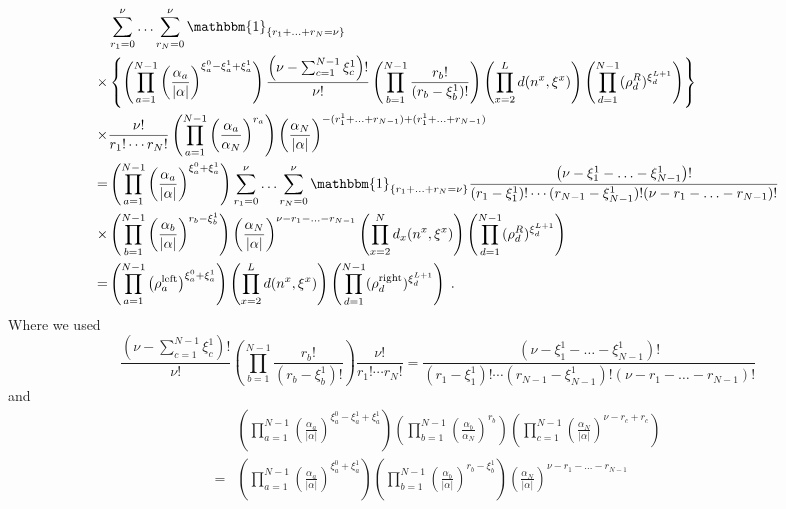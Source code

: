 \documentclass[10pt]{article}
\numberwithin{equation}{section}
\numberwithin{equation}{subsection}
\newcommand{\dt}{\;.}
\begin{document}
\begin{align}\label{pezzo1}
	&\sum_{r_{1}=0}^{\nu}\ldots\sum_{r_{N}=0}^{\nu}\mathbbm{1}_{\{r_{1}+\ldots+r_{N}=\nu\}}\nonumber
	\\
	\times&
	\left\{\left(\prod_{a=1}^{N-1}\left(\frac{\alpha_{a}}{|\alpha|}\right)^{\xi_{a}^{0}-\xi_{a}^{1}+\xi_{a}^{1}}\right)\frac{\left(\nu-\sum_{c=1}^{N-1}\xi_{c}^{1}\right)!}{\nu!}\left(\prod_{b=1}^{N-1}\frac{r_{b}!}{(r_{b}-\xi^{1}_{b})!}\right)\left(\prod_{x=2}^{L}d(n^{x},\xi^{x})\right)\left(\prod_{d=1}^{N-1}(\rho_{d}^{R})^{\xi_{d}^{L+1}}\right)\right\}\nonumber\\
	\times	&\frac{\nu!}{r_{1}!\cdots r_{N}!}\left(\prod_{a=1}^{N-1}\left(\frac{\alpha_{a}}{\alpha_{N}}\right)^{r_{a}}\right)\left(\frac{\alpha_{N}}{|\alpha|}\right)^{-(r_{1}^{1}+\ldots+r_{N-1})+(r_{1}^{1}+\ldots+r_{N-1})}\nonumber
	\\=&
	\left(\prod_{a=1}^{N-1}\left(\frac{\alpha_{a}}{|\alpha|}\right)^{\xi_{a}^{0}+\xi_{a}^{1}}\right)\sum_{r_{1}=0}^{\nu}\ldots\sum_{r_{N}=0}^{\nu}\mathbbm{1}_{\{r_{1}+\ldots+r_{N}=\nu\}}	\frac{\left(\nu-\xi_{1}^{1}-\ldots-\xi_{N-1}^{1}\right)!}{(r_{1}-\xi_{1}^{1})!\cdots(r_{N-1}-\xi_{N-1}^{1})!(\nu-r_{1}-\ldots-r_{N-1})!}\nonumber\\
	\times& \left(\prod_{b=1}^{N-1}\left(\frac{\alpha_{b}}{|\alpha|}\right)^{r_{b}-\xi_{b}^{1}}\right)\left(\frac{\alpha_{N}}{|\alpha|}\right)^{\nu-r_{1}-\ldots-r_{N-1}}\left(\prod_{x=2}^{N}d_{x}(n^{x},\xi^{x})\right)\left(\prod_{d=1}^{N-1}(\rho_{d}^{R})^{\xi_{d}^{L+1}}\right)\nonumber
	\\=&
	\left(\prod_{a=1}^{N-1}\left(\rho_{a}^{\text{left}}\right)^{\xi_{a}^{0}+\xi_{a}^{1}}\right)\left(\prod_{x=2}^{L}d(n^{x},\xi^{x})\right)\left(\prod_{d=1}^{N-1}(\rho_{d}^{\text{right}})^{\xi_{d}^{L+1}}\right)\dt
\end{align}
Where we used 
\begin{equation*}
\frac{\left(\nu-\sum_{c=1}^{N-1}\xi_{c}^{1}\right)!}{\nu!}\left(\prod_{b=1}^{N-1}\frac{r_{b}!}{(r_{b}-\xi^{1}_{b})!}\right)\frac{\nu!}{r_{1}!\cdots r_{N}!}=\frac{\left(\nu-\xi_{1}^{1}-\ldots-\xi_{N-1}^{1}\right)!}{(r_{1}-\xi_{1}^{1})!\cdots(r_{N-1}-\xi_{N-1}^{1})!(\nu-r_{1}-\ldots-r_{N-1})!}
\end{equation*}
and 
\begin{align*}
&\left(\prod_{a=1}^{N-1}\left(\frac{\alpha_{a}}{|\alpha|}\right)^{\xi_{a}^{0}-\xi_{a}^{1}+\xi_{a}^{1}}\right)\left(\prod_{b=1}^{N-1}\left(\frac{\alpha_{b}}{\alpha_{N}}\right)^{r_{b}}\right)\left(\prod_{c=1}^{N-1}\left(\frac{\alpha_{N}}{|\alpha|}\right)^{\nu-r_{c}+r_{c}}\right)\\=&	\left(\prod_{a=1}^{N-1}\left(\frac{\alpha_{a}}{|\alpha|}\right)^{\xi_{a}^{0}+\xi_{a}^{1}}\right)\left(\prod_{b=1}^{N-1}\left(\frac{\alpha_{b}}{|\alpha|}\right)^{r_{b}-\xi_{b}^{1}}\right)\left(\frac{\alpha_{N}}{|\alpha|}\right)^{\nu-r_{1}-\ldots-r_{N-1}}
\end{align*}
\end{document}
